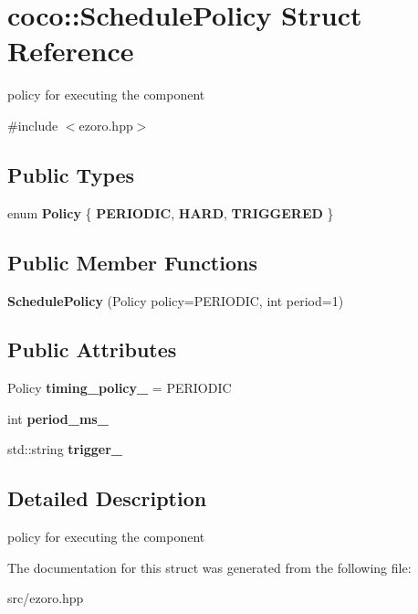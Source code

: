 \hypertarget{structcoco_1_1_schedule_policy}{\section{coco\-:\-:Schedule\-Policy Struct Reference}
\label{structcoco_1_1_schedule_policy}
}


policy for executing the component  




{\ttfamily \#include $<$ezoro.\-hpp$>$}

\subsection*{Public Types}
\begin{DoxyCompactItemize}
\item 
enum {\bfseries Policy} \{ {\bfseries P\-E\-R\-I\-O\-D\-I\-C}, 
{\bfseries H\-A\-R\-D}, 
{\bfseries T\-R\-I\-G\-G\-E\-R\-E\-D}
 \}
\end{DoxyCompactItemize}
\subsection*{Public Member Functions}
\begin{DoxyCompactItemize}
\item 
\hypertarget{structcoco_1_1_schedule_policy_a10ca5e9aacf647c410a160cf6981ba1b}{{\bfseries Schedule\-Policy} (Policy policy=P\-E\-R\-I\-O\-D\-I\-C, int period=1)}\label{structcoco_1_1_schedule_policy_a10ca5e9aacf647c410a160cf6981ba1b}

\end{DoxyCompactItemize}
\subsection*{Public Attributes}
\begin{DoxyCompactItemize}
\item 
\hypertarget{structcoco_1_1_schedule_policy_ab1d0eb6297cf9b1630d56b24ca56e0ce}{Policy {\bfseries timing\-\_\-policy\-\_\-} = P\-E\-R\-I\-O\-D\-I\-C}\label{structcoco_1_1_schedule_policy_ab1d0eb6297cf9b1630d56b24ca56e0ce}

\item 
\hypertarget{structcoco_1_1_schedule_policy_a1c4cad7562e9b30fdae43e8be3708b6e}{int {\bfseries period\-\_\-ms\-\_\-}}\label{structcoco_1_1_schedule_policy_a1c4cad7562e9b30fdae43e8be3708b6e}

\item 
\hypertarget{structcoco_1_1_schedule_policy_ac2019bc1c226a87b984d6e4a40a3219f}{std\-::string {\bfseries trigger\-\_\-}}\label{structcoco_1_1_schedule_policy_ac2019bc1c226a87b984d6e4a40a3219f}

\end{DoxyCompactItemize}


\subsection{Detailed Description}
policy for executing the component 

The documentation for this struct was generated from the following file\-:\begin{DoxyCompactItemize}
\item 
src/ezoro.\-hpp\end{DoxyCompactItemize}
